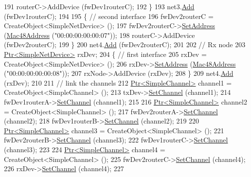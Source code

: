 \begin{DoxyCode}
191     routerC->AddDevice (fwDev1routerC);
192   \}
193   net3.\hyperlink{classns3_1_1NetDeviceContainer_a7ca8bc1d7ec00fd4fcc63869987fbda5}{Add} (fwDev1routerC);
194 
195   \{ \textcolor{comment}{// second interface}
196     fwDev2routerC = CreateObject<SimpleNetDevice> ();
197     fwDev2routerC->\hyperlink{classns3_1_1SimpleNetDevice_a968ef3e7318bac29d5f1d7d977029af4}{SetAddress} (\hyperlink{classns3_1_1Mac48Address}{Mac48Address} (\textcolor{stringliteral}{"00:00:00:00:00:07"}));
198     routerC->AddDevice (fwDev2routerC);
199   \}
200   net4.\hyperlink{classns3_1_1NetDeviceContainer_a7ca8bc1d7ec00fd4fcc63869987fbda5}{Add} (fwDev2routerC);
201 
202   \textcolor{comment}{// Rx node}
203   \hyperlink{classns3_1_1Ptr}{Ptr<SimpleNetDevice>} rxDev;
204   \{ \textcolor{comment}{// first interface}
205     rxDev = CreateObject<SimpleNetDevice> ();
206     rxDev->\hyperlink{classns3_1_1SimpleNetDevice_a968ef3e7318bac29d5f1d7d977029af4}{SetAddress} (\hyperlink{classns3_1_1Mac48Address}{Mac48Address} (\textcolor{stringliteral}{"00:00:00:00:00:08"}));
207     rxNode->AddDevice (rxDev);
208   \}
209   net4.\hyperlink{classns3_1_1NetDeviceContainer_a7ca8bc1d7ec00fd4fcc63869987fbda5}{Add} (rxDev);
210 
211   \textcolor{comment}{// link the channels}
212   \hyperlink{classns3_1_1Ptr}{Ptr<SimpleChannel>} channel1 = CreateObject<SimpleChannel> ();
213   txDev->\hyperlink{classns3_1_1SimpleNetDevice_af9e9828ad584b5ba538f18f645f162e0}{SetChannel} (channel1);
214   fwDev1routerA->\hyperlink{classns3_1_1SimpleNetDevice_af9e9828ad584b5ba538f18f645f162e0}{SetChannel} (channel1);
215 
216   \hyperlink{classns3_1_1Ptr}{Ptr<SimpleChannel>} channel2 = CreateObject<SimpleChannel> ();
217   fwDev2routerA->\hyperlink{classns3_1_1SimpleNetDevice_af9e9828ad584b5ba538f18f645f162e0}{SetChannel} (channel2);
218   fwDev1routerB->\hyperlink{classns3_1_1SimpleNetDevice_af9e9828ad584b5ba538f18f645f162e0}{SetChannel} (channel2);
219 
220   \hyperlink{classns3_1_1Ptr}{Ptr<SimpleChannel>} channel3 = CreateObject<SimpleChannel> ();
221   fwDev2routerB->\hyperlink{classns3_1_1SimpleNetDevice_af9e9828ad584b5ba538f18f645f162e0}{SetChannel} (channel3);
222   fwDev1routerC->\hyperlink{classns3_1_1SimpleNetDevice_af9e9828ad584b5ba538f18f645f162e0}{SetChannel} (channel3);
223 
224   \hyperlink{classns3_1_1Ptr}{Ptr<SimpleChannel>} channel4 = CreateObject<SimpleChannel> ();
225   fwDev2routerC->\hyperlink{classns3_1_1SimpleNetDevice_af9e9828ad584b5ba538f18f645f162e0}{SetChannel} (channel4);
226   rxDev->\hyperlink{classns3_1_1SimpleNetDevice_af9e9828ad584b5ba538f18f645f162e0}{SetChannel} (channel4);
227 

\end{DoxyCode}

